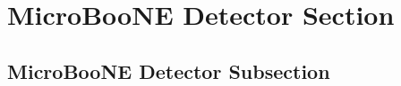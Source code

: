 
\section{MicroBooNE Detector Section}\label{UBDetectorSection}

\subsection{MicroBooNE Detector Subsection}
